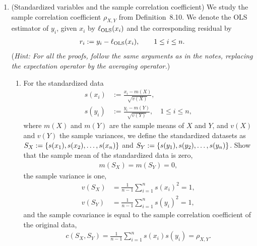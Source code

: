 \documentclass[12pt,twoside]{article}
\begin{document}
\begin{enumerate}
\begin{enumerate}
\end{enumerate}

\item (Standardized variables and the sample correlation coefficient) 
We study the sample correlation coefficient $\rho_{X,Y} $ from Definition~8.10. 
We denote the OLS estimator of $y_i$, given $x_i$ by $\ell_{\operatorname{OLS}} (x_i)$ and the corresponding residual by 
\begin{align}
r_i := y_i -  \ell_{\operatorname{OLS}} (x_i), \qquad 1\leq i \leq n.
\end{align}
(\emph{Hint: For all the proofs, follow the same arguments as in the notes, replacing the expectation operator by the averaging operator.})
\begin{enumerate} 
\item For the standardized data
\begin{align}
s(x_i) & := \frac{x_i - m(X)}{\sqrt{v(X)}}, \\
s(y_i) & := \frac{y_i - m(Y)}{\sqrt{v(Y)}}, \quad 1 \leq i \leq n,
\end{align}
where $m(X)$ and $m( Y)$ are the sample means of $X$ and $Y$, and $v(X)$ and $v(Y)$ the sample variances, we define the standardized datasets as $S_X:= \left\{ s(x_1),s(x_2),\ldots,s(x_n) \right\}$ and $S_Y:= \left\{ s(y_1),s(y_2),\ldots,s(y_n) \right\}$. Show that the sample mean of the standardized data is zero,
\begin{align}
m(S_X) = m(S_Y)=0,
\end{align}
the sample variance is one,
\begin{align}
v(S_X) & = \frac{1}{n-1}\sum_{i=1}^{n}s(x_i)^2 = 1,\\
v(S_Y) & = \frac{1}{n-1}\sum_{i=1}^{n}s(y_i)^2 =1,
\end{align}
and the sample covariance is equal to the sample correlation coefficient of the original data,
\begin{align}
c(S_X,S_Y)=\frac{1}{n-1}\sum_{i=1}^{n}s(x_i)s(y_i) = \rho_{X,Y}.
\end{align}
\begin{itemize}

\end{itemize}
\end{enumerate}
\end{enumerate}
\end{document}
